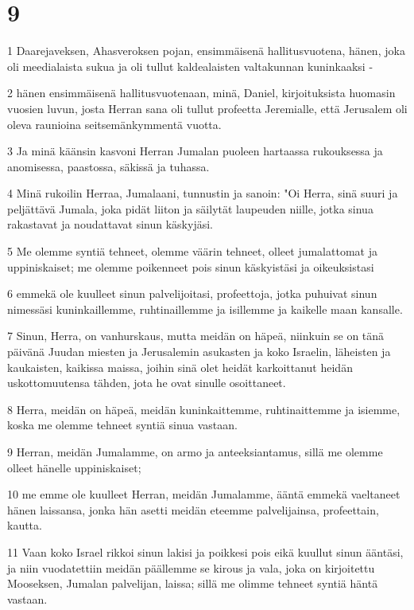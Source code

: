 \chapter{9}

\par 1 Daarejaveksen, Ahasveroksen pojan, ensimmäisenä hallitusvuotena, hänen, joka oli meedialaista sukua ja oli tullut kaldealaisten valtakunnan kuninkaaksi -
\par 2 hänen ensimmäisenä hallitusvuotenaan, minä, Daniel, kirjoituksista huomasin vuosien luvun, josta Herran sana oli tullut profeetta Jeremialle, että Jerusalem oli oleva raunioina seitsemänkymmentä vuotta.
\par 3 Ja minä käänsin kasvoni Herran Jumalan puoleen hartaassa rukouksessa ja anomisessa, paastossa, säkissä ja tuhassa.
\par 4 Minä rukoilin Herraa, Jumalaani, tunnustin ja sanoin: "Oi Herra, sinä suuri ja peljättävä Jumala, joka pidät liiton ja säilytät laupeuden niille, jotka sinua rakastavat ja noudattavat sinun käskyjäsi.
\par 5 Me olemme syntiä tehneet, olemme väärin tehneet, olleet jumalattomat ja uppiniskaiset; me olemme poikenneet pois sinun käskyistäsi ja oikeuksistasi
\par 6 emmekä ole kuulleet sinun palvelijoitasi, profeettoja, jotka puhuivat sinun nimessäsi kuninkaillemme, ruhtinaillemme ja isillemme ja kaikelle maan kansalle.
\par 7 Sinun, Herra, on vanhurskaus, mutta meidän on häpeä, niinkuin se on tänä päivänä Juudan miesten ja Jerusalemin asukasten ja koko Israelin, läheisten ja kaukaisten, kaikissa maissa, joihin sinä olet heidät karkoittanut heidän uskottomuutensa tähden, jota he ovat sinulle osoittaneet.
\par 8 Herra, meidän on häpeä, meidän kuninkaittemme, ruhtinaittemme ja isiemme, koska me olemme tehneet syntiä sinua vastaan.
\par 9 Herran, meidän Jumalamme, on armo ja anteeksiantamus, sillä me olemme olleet hänelle uppiniskaiset;
\par 10 me emme ole kuulleet Herran, meidän Jumalamme, ääntä emmekä vaeltaneet hänen laissansa, jonka hän asetti meidän eteemme palvelijainsa, profeettain, kautta.
\par 11 Vaan koko Israel rikkoi sinun lakisi ja poikkesi pois eikä kuullut sinun ääntäsi, ja niin vuodatettiin meidän päällemme se kirous ja vala, joka on kirjoitettu Mooseksen, Jumalan palvelijan, laissa; sillä me olimme tehneet syntiä häntä vastaan.
